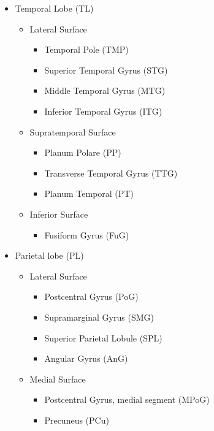 \begin{itemize}
    \item Temporal Lobe (TL)
        \begin{itemize}
        \item Lateral Surface
            \begin{itemize}
            \item Temporal Pole (TMP)
            \item Superior Temporal Gyrus (STG)
            \item Middle Temporal Gyrus (MTG)
            \item Inferior Temporal Gyrus (ITG)
            \end{itemize}
        \item Supratemporal Surface
            \begin{itemize}
            \item Planum Polare (PP)
            \item Transverse Temporal Gyrus (TTG)
            \item Planum Temporal (PT)
             \end{itemize}
        \item Inferior Surface
            \begin{itemize}
            \item Fusiform Gyrus (FuG)
            \end{itemize}
        \end{itemize}
    \item Parietal lobe (PL)
        \begin{itemize}
        \item Lateral Surface
            \begin{itemize}
            \item Postcentral Gyrus (PoG)
            \item Supramarginal Gyrus (SMG)
            \item Superior Parietal Lobule (SPL)
            \item Angular Gyrus (AnG)
            \end{itemize}
        \item Medial Surface
            \begin{itemize}
            \item Postcentral Gyrus, medial segment (MPoG)
            \item Precuneus (PCu)
            \end{itemize}
        \end{itemize}
    

\end{itemize}
